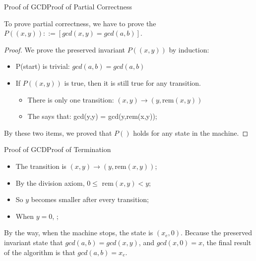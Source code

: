 \begin{frame}{Proof of GCD}{Proof of Partial Correctness}

  To prove partial correctness, we have to prove the  $P((x,y)) ::= [gcd(x,y) = gcd(a,b)]$.

  \begin{proof}
    We prove the preserved invariant $P((x,y))$ by induction:

    \begin{itemize}
      \item P(start) is trivial: $gcd(a,b) = gcd(a,b)$
      \item If $P((x,y))$ is true, then it is still true for any transition.
      \begin{itemize}
        \item There is only one transition: $(x,y) \to (y,\text{rem}(x,y))$
        \item The  says that: gcd(y,y) = gcd(y,rem(x,y));
      \end{itemize}
    \end{itemize}
    By these two items, we proved that $P()$ holds for any state in the machine.
  \end{proof}
\end{frame}

\begin{frame}{Proof of GCD}{Proof of Termination}
  \begin{itemize}
    \item The transition is $(x,y) \to (y,\text{rem}(x,y))$;
    \item By the division axiom, $0 \leq \text{ rem}(x,y) < y$;
    \item So $y$ becomes smaller after every transition;
    \item When $y = 0$, ;
  \end{itemize}\bigskip

  By the way, when the machine stops, the state is $(x_e,0)$. Because the preserved invariant state that $gcd(a,b) = gcd(x,y)$, and $gcd(x,0) = x$, the final result of the algorithm is that $gcd(a,b) = x_e$.
\end{frame}

